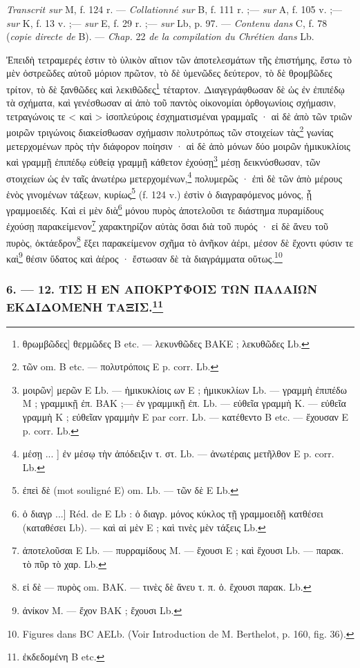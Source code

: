 \documentclass[a4paper, 11pt, oneside, polutonikogreek, french]{article}
\begin{document}
\emph{Transcrit sur} M, f. 124 r. --- \emph{Collationné sur} B, f. 111 r. ;--- \emph{sur} A, f. 105 v. ;---
\emph{sur} K, f. 13 v. ;--- \emph{sur} E, f. 29 r. ;--- \emph{sur} Lb, p. 97. --- \emph{Contenu dans} C, f. 78 (\emph{copie
directe de} B). --- \emph{Chap.} 22 \emph{de la compilation du Chrétien dans} Lb.

Ἐπειδὴ τετραμερές ἐστιν τὸ ὑλικὸν αἴτιον τῶν ἀποτελεσμάτων τῆς ἐπιστήμης, ἔστω τὸ μὲν ὀστρεῶδες αὐτοῦ μόριον πρῶτον, τὸ δὲ ὑμενῶδες δεύτερον, τὸ δὲ θρομβῶδες τρίτον, τὸ δὲ ξανθῶδες καὶ λεκιθῶδες\footnote{θρωμβῶδες] θερμῶδες B etc. --- λεκυνθῶδες BAKE ; λεκυθῶδες Lb.} τέταρτον. Διαγεγράφθωσαν δὲ ὡς ἐν ἐπιπέδῳ τὰ σχήματα, καὶ γενέσθωσαν αἱ ἀπὸ τοῦ παντὸς οἰκονομίαι ὀρθογωνίοις σχήμασιν, τετραγώνοις τε < καὶ > ἰσοπλεύροις ἐσχηματισμέναι γραμμαῖς · αἱ δὲ ἀπὸ τῶν τριῶν μοιρῶν τριγώνοις διακείσθωσαν σχήμασιν πολυτρόπως τῶν στοιχείων τὰς\footnote{τῶν om. B etc. --- πολυτρόποις E p. corr. Lb.} γωνίας μετερχομένων πρὸς τὴν διάφορον ποίησιν · αἱ δὲ ἀπὸ μόνων δύο μοιρῶν ἡμικυκλίοις καὶ γραμμῇ ἐπιπέδῳ εὐθείᾳ γραμμῇ κάθετον ἐχούσῃ\footnote{μοιρῶν] μερῶν E Lb. --- ἡμικυκλίοις ων E ; ἡμικυκλίων Lb. --- γραμμὴ ἐπιπέδω M ; γραμμικῇ ἐπ. BAK ;--- ἐν γραμμικῇ ἐπ. Lb. --- εὐθεῖα γραμμὴ K. --- εὐθεῖα γραμμὴ K ; εὐθεῖαν γραμμὴν E par corr. Lb. --- κατέθεντο B etc. --- ἔχουσαν E p. corr. Lb.} μέσῃ δεικνύσθωσαν, τῶν στοιχείων ὡς ἐν ταῖς ἀνωτέρω μετερχομένων,\footnote{μέσῃ ... ] ἐν μέσῳ τὴν ἀπόδειξιν τ. στ. Lb. --- ἀνωτέραις μετῆλθον E p. corr. Lb.} πολυμερῶς · ἐπὶ δὲ τῶν ἀπὸ μέρους ἑνὸς γινομένων τάξεων, κυρίως\footnote{ἐπεὶ δὲ (mot souligné E) om. Lb. --- τῶν δὲ E Lb.} (f. 124 v.) ἐστὶν ὁ διαγραφόμενος μόνος, ᾗ γραμμοειδές. Καὶ εἰ μὲν διὰ\footnote{ὁ διαγρ ...] Réd. de E Lb : ὁ διαγρ. μόνος κύκλος τῇ γραμμοειδῇ κατθέσει (καταθέσει Lb). --- καὶ αἱ μὲν E ; καὶ τινὲς μὲν τάξεις Lb.} μόνου πυρὸς ἀποτελοῦσι τε διάστημα πυραμίδους ἐχούσῃ παρακείμενον\footnote{ἀποτελοῦσαι E Lb. --- πυρραμίδους M. --- ἔχουσι E ; καὶ ἔχουσι Lb. --- παρακ. τὸ πῦρ τὸ χαρ. Lb.} χαρακτηρίζον αὐτὰς ὅσαι διὰ τοῦ πυρός · εἰ δὲ ἄνευ τοῦ πυρὸς, ὀκτάεδρον\footnote{εἰ δὲ --- πυρὸς om. BAK. --- τινὲς δὲ ἄνευ τ. π. ὀ. ἔχουσι παρακ. Lb.} ἕξει παρακείμενον σχῆμα τὸ ἀνῆκον ἀέρι, μέσον δὲ ἔχοντι φύσιν τε καὶ\footnote{ἀνίκον M. --- ἔχον BAK ; ἔχουσι Lb.} θέσιν ὕδατος καὶ ἀέρος · ἔστωσαν δὲ τὰ διαγράμματα οὕτως.\footnote{Figures dans BC AELb. (Voir Introduction de M. Berthelot, p. 160, fig. 36).}

\bigskip
\centerline{\EightStarTaper}
\centerline{\EightStarTaper\EightStarTaper}
\bigskip

\subsubsection[6. --- 12. ΤΙΣ Η ΕΝ ΑΠΟΚΡΥΦΟΙΣ ΤΩΝ ΠΑΛΑΙΩΝ ΕΚΔΙΔΟΜΕΝΗ ΤΑΞΙΣ.]{6. --- 12. ΤΙΣ Η ΕΝ ΑΠΟΚΡΥΦΟΙΣ ΤΩΝ ΠΑΛΑΙΩΝ ΕΚΔΙΔΟΜΕΝΗ ΤΑΞΙΣ.\footnote{ἐκδεδομένη B etc.}}
\end{document}

